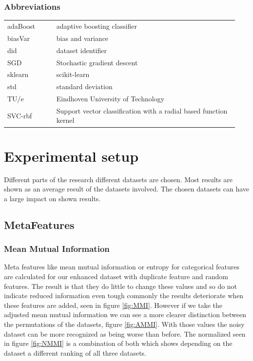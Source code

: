 \documentclass[a4paper,10pt]{article}
\begin{document}
\subsubsection{Abbreviations}
\begin{tabular}{ p{0.20\linewidth} p{0.7437\linewidth} }
	
	adaBoost & adaptive boosting classifier \\
	
	biasVar & bias and variance \\
	
	did & dataset identifier \\
	
	SGD & Stochastic gradient descent \\
	
	sklearn & scikit-learn \\
	
	std & standard deviation\\
	
	TU/e & Eindhoven University of Technology \\
	
	SVC-rbf & Support vector classification with a radial based function kernel
	
	
\end{tabular}

\newpage
\section{Experimental setup} \label{Chapter3}
Different parts of the research different datasets are chosen. Most results are shown as an average result of the datasets involved. The chosen datasets can have a large impact on shown results. 

\subsection{MetaFeatures}

\subsubsection{Mean Mutual Information}\label{chapter311}
Meta features like mean mutual information or entropy for categorical features are calculated for our enhanced dataset with duplicate feature and random features. The result is that they do little to change these values and so do not indicate reduced information even tough commonly the results deteriorate when these features are added, seen in figure \ref{fig:MMI}. However if we take the adjusted mean mutual information we can see a more clearer distinction between the permutations of the datasets, figure \ref{fig:AMMI}. With those values the noisy dataset can be more recognized as being worse than before. The normalized seen in figure \ref{fig:NMMI}  is a combination of both which shows depending on the dataset a different ranking of all three datasets.
\end{document}
